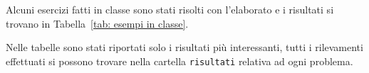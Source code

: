 \documentclass[a4paper,11pt]{article} %
\newcommand{\file}{\texttt}
\begin{document}
Alcuni esercizi fatti in classe sono stati risolti con l'elaborato e i
risultati si trovano in Tabella~\ref{tab: esempi in classe}.

Nelle tabelle sono stati riportati solo i risultati più interessanti, 
tutti i rilevamenti effettuati si possono trovare nella cartella \file{risultati}
relativa ad ogni problema.


%
%
%
\end{document}
